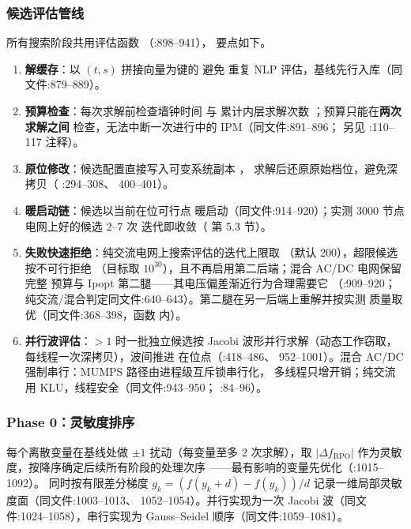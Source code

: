 \subsubsection*{候选评估管线}
所有搜索阶段共用评估函数 
（:898--941），
要点如下。
\begin{enumerate}
  \item \textbf{解缓存}：以 $(t,s)$ 拼接向量为键的  避免
        重复 NLP 评估，基线先行入库（同文件:879--889）。
  \item \textbf{预算检查}：每次求解前检查墙钟时间  与
        累计内层求解次数 ；预算只能在\textbf{两次求解之间}
        检查，无法中断一次进行中的 IPM（同文件:891--896；
        另见 :110--117
        注释）。
  \item \textbf{原位修改}：候选配置直接写入可变系统副本 ，
        求解后还原原始档位，避免深拷贝（
        :294--308、
        400--401）。
  \item \textbf{暖启动链}：候选以当前在位可行点 
        暖启动（同文件:914--920）；实测 3000 节点电网上好的候选 2--7 次
        迭代即收敛（
        第 5.3 节）。
  \item \textbf{失败快速拒绝}：纯交流电网上搜索评估的迭代上限取
        （默认 200），超限候选按不可行拒绝
        （目标取 $10^{30}$），且不再启用第二后端；混合 AC/DC 电网保留完整
        预算与 Ipopt 第二腿——其电压偏差渐近行为合理需要它
        （:909--920；
        纯交流/混合判定同文件:640--643）。第二腿在另一后端上重解并按实测
        质量取优（同文件:368--398，函数  内）。
  \item \textbf{并行波评估}：$>1$ 时一批独立候选按
        Jacobi 波形并行求解（动态工作窃取，每线程一次深拷贝），波间推进
        在位点（:418--486、
        952--1001）。混合 AC/DC 强制串行：MUMPS 路径由进程级互斥锁串行化，
        多线程只增开销；纯交流用 KLU，线程安全（同文件:943--950；
        :84--96）。
\end{enumerate}

\subsubsection*{Phase 0：灵敏度排序}
每个离散变量在基线处做 $\pm1$ 扰动（每变量至多 2 次求解），取
$|\Delta f_{\mathrm{RPO}}|$ 作为灵敏度，按降序确定后续所有阶段的处理次序
——最有影响的变量先优化（:1015--1092）。
同时按有限差分梯度
$g_k=(f(y_k+d)-f(y_k))/d$ 记录一维局部灵敏度面（同文件:1003--1013、
1052--1054）。并行实现为一次 Jacobi 波（同文件:1024--1058），串行实现为
Gauss--Seidel 顺序（同文件:1059--1081）。

